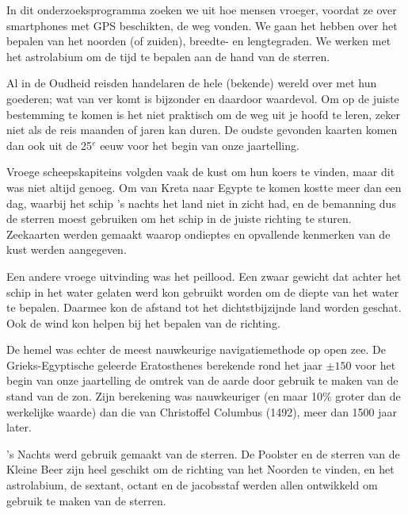 In dit onderzoeksprogramma zoeken we uit hoe mensen vroeger, voordat ze over smartphones met GPS beschikten, de weg vonden. We gaan het hebben over het bepalen van het noorden (of zuiden), breedte- en lengtegraden. We werken met het astrolabium om de tijd te bepalen aan de hand van de sterren.

Al in de Oudheid reisden handelaren de hele (bekende) wereld over met hun goederen; wat van ver komt is bijzonder en daardoor waardevol. Om op de juiste bestemming te komen is het niet praktisch om de weg uit je hoofd te leren, zeker niet als de reis maanden of jaren kan duren. De oudste gevonden kaarten komen dan ook uit de 25$^{e}$ eeuw voor het begin van onze jaartelling. 

Vroege scheepskapiteins volgden vaak de kust om hun koers te vinden, maar dit was niet altijd genoeg. Om van Kreta naar Egypte te komen kostte meer dan een dag, waarbij het schip 's nachts het land niet in zicht had, en de bemanning dus de sterren moest gebruiken om het schip in de juiste richting te sturen. Zeekaarten werden gemaakt waarop ondieptes en opvallende kenmerken van de kust werden aangegeven.

Een andere vroege uitvinding was het peillood. Een zwaar gewicht dat achter het schip in het water gelaten werd kon gebruikt worden om de diepte van het water te bepalen. Daarmee kon de afstand tot het dichtstbijzijnde land worden geschat. Ook de wind kon helpen bij het bepalen van de richting.

De hemel was echter de meest nauwkeurige navigatiemethode op open zee. De Grieks-Egyptische geleerde Eratosthenes berekende rond het jaar $\pm 150$ voor het begin van onze jaartelling de omtrek van de aarde door gebruik te maken van de stand van de zon. Zijn berekening was nauwkeuriger (en maar 10$\%$ groter dan de werkelijke waarde) dan die van Christoffel Columbus (1492), meer dan 1500 jaar later.

's Nachts werd gebruik gemaakt van de sterren. De Poolster en de sterren van de Kleine Beer zijn heel geschikt om de richting van het Noorden te vinden, en het astrolabium, de sextant, octant en de jacobsstaf werden allen ontwikkeld om gebruik te maken van de sterren.


